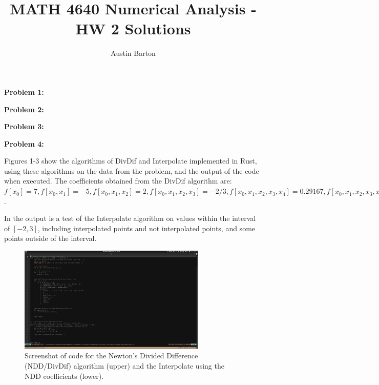 \documentclass[12pt, letterpaper]{article}
\title{MATH 4640 Numerical Analysis - HW 2 Solutions}
\author{Austin Barton}
\theoremstyle{nonumberplain}
\begin{document}
\maketitle

\vspace{2em}

\hspace{18pt}\textbf{Problem 1:} \medskip


\hspace{18pt}\textbf{Problem 2:} \medskip


\hspace{18pt}\textbf{Problem 3:} \medskip


\hspace{18pt}\textbf{Problem 4:} \medskip

Figures 1-3 show the algorithms of DivDif and Interpolate implemented in Rust, using these algorithms on the data from the problem, and the output of the code when executed. The coefficients obtained from the DivDif algorithm are: $f[x_0] = 7, f[x_0, x_1] = -5, f[x_0, x_1, x_2] = 2, f[x_0, x_1, x_2, x_3] = -2/3, f[x_0, x_1, x_2, x_3, x_4] = 0.29167, f[x_0, x_1, x_2, x_3, x_4, x_5] = -0.125$.

In the output is a test of the Interpolate algorithm on values within the interval of $[-2, 3]$, including interpolated points and not interpolated points, and some points outside of the interval.

\begin{figure}[!htbp]
	\centering
	\includegraphics[width=0.8\textwidth]{ndd_and_interpolate_screenshot.png}
	\caption{Screenshot of code for the Newton's Divided Difference (NDD/DivDif) algorithm (upper) and the Interpolate using the NDD coefficients (lower).}
\end{figure}
\end{document}

